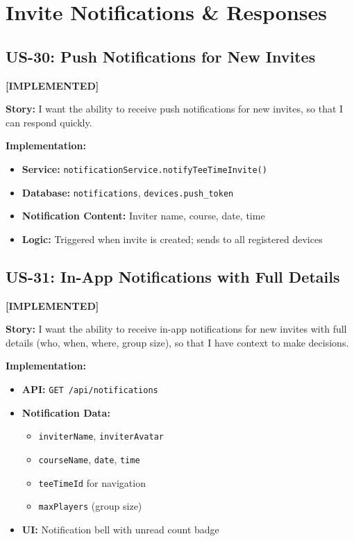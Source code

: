 \documentclass[11pt,a4paper]{article}
\newcommand{\implemented}{\textcolor{implemented}{\textbf{[IMPLEMENTED]}}}
\begin{document}
\section{Invite Notifications \& Responses}

\subsection{US-30: Push Notifications for New Invites}
\implemented

\textbf{Story:} I want the ability to receive push notifications for new invites, so that I can respond quickly.

\textbf{Implementation:}
\begin{itemize}[leftmargin=*]
  \item \textbf{Service:} \texttt{notificationService.notifyTeeTimeInvite()}
  \item \textbf{Database:} \texttt{notifications}, \texttt{devices.push\_token}
  \item \textbf{Notification Content:} Inviter name, course, date, time
  \item \textbf{Logic:} Triggered when invite is created; sends to all registered devices
\end{itemize}

\subsection{US-31: In-App Notifications with Full Details}
\implemented

\textbf{Story:} I want the ability to receive in-app notifications for new invites with full details (who, when, where, group size), so that I have context to make decisions.

\textbf{Implementation:}
\begin{itemize}[leftmargin=*]
  \item \textbf{API:} \texttt{GET /api/notifications}
  \item \textbf{Notification Data:}
    \begin{itemize}
      \item \texttt{inviterName}, \texttt{inviterAvatar}
      \item \texttt{courseName}, \texttt{date}, \texttt{time}
      \item \texttt{teeTimeId} for navigation
      \item \texttt{maxPlayers} (group size)
    \end{itemize}
  \item \textbf{UI:} Notification bell with unread count badge
\end{itemize}
\end{document}
